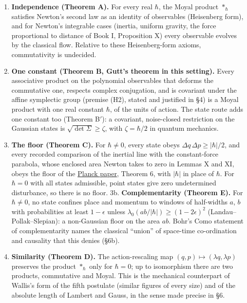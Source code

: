 \documentclass[11pt,a4paper]{article}
\newcommand{\tightlist}{\setlength{\itemsep}{0pt}\setlength{\parskip}{0pt}}
\begin{document}
\begin{enumerate}
\def\labelenumi{\arabic{enumi}.}
\tightlist
\item
  \textbf{Independence (Theorem A).} For every real \(\hbar\), the Moyal
  product \(*_\hbar\) satisfies Newton's second law as an identity of
  observables (Heisenberg form), and for Newton's integrable cases
  (inertia, uniform gravity, the force proportional to distance of Book
  I, Proposition X) every observable evolves by the classical flow.
  Relative to these Heisenberg-form axioms, commutativity is undecided.
\item
  \textbf{One constant (Theorem B, Gutt's theorem in this setting).}
  Every associative product on the polynomial observables that deforms
  the commutative one, respects complex conjugation, and is covariant
  under the affine symplectic group (premise (H2), stated and justified
  in §4) is a Moyal product with one real constant \(\hbar\), of the
  units of action. The state route adds one constant too (Theorem
  B\('\)): a covariant, noise-closed restriction on the Gaussian states
  is \(\sqrt{\det\Sigma}\ge\zeta\), with \(\zeta=\hbar/2\) in quantum
  mechanics.
\item
  \textbf{The floor (Theorem C).} For \(\hbar\ne0\), every state obeys
  \(\Delta q\,\Delta p\ge|\hbar|/2\), and every recorded comparison of
  the inertial line with the constant-force parabola, whose enclosed
  area Newton takes to zero in Lemmas X and XI, obeys the floor of the
  \href{planck-gap-paper.md}{Planck paper}, Theorem 6, with \(|\hbar|\)
  in place of \(\hbar\). For \(\hbar=0\) with all states admissible,
  point states give zero undetermined disturbance, so there is no floor.
  3b. \textbf{Complementarity (Theorem E).} For \(\hbar\ne0\), no state
  confines place and momentum to windows of half-widths \(a\), \(b\)
  with probabilities at least \(1-\epsilon\) unless
  \(\lambda_0(ab/|\hbar|)\ge(1-2\epsilon)^2\) (Landau--Pollak--Slepian):
  a non-Gaussian floor on the area \(ab\). Bohr's Como statement of
  complementarity names the classical ``union'' of space-time
  co-ordination and causality that this denies (§6b).
\item
  \textbf{Similarity (Theorem D).} The action-rescaling map
  \((q,p)\mapsto(\lambda q,\lambda p)\) preserves the product
  \(*_\hbar\) only for \(\hbar=0\); up to isomorphism there are two
  products, commutative and Moyal. This is the mechanical counterpart of
  Wallis's form of the fifth postulate (similar figures of every size)
  and of the absolute length of Lambert and Gauss, in the sense made
  precise in §6.
\end{enumerate}
\end{document}
